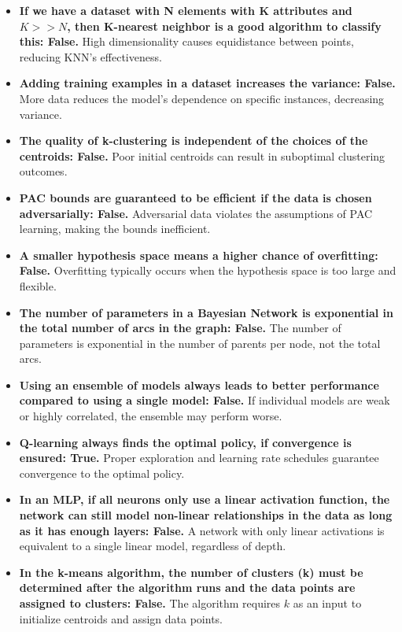 \documentclass[10pt,a4paper]{article}
\begin{document}
\begin{itemize}
    \item \textbf{If we have a dataset with N elements with K attributes and $K >> N$, then K-nearest neighbor is a good algorithm to classify this: False.} High dimensionality causes equidistance between points, reducing KNN's effectiveness.

    \item \textbf{Adding training examples in a dataset increases the variance: False.} More data reduces the model's dependence on specific instances, decreasing variance.

    \item \textbf{The quality of k-clustering is independent of the choices of the centroids: False.} Poor initial centroids can result in suboptimal clustering outcomes.

    \item \textbf{PAC bounds are guaranteed to be efficient if the data is chosen adversarially: False.} Adversarial data violates the assumptions of PAC learning, making the bounds inefficient.

    \item \textbf{A smaller hypothesis space means a higher chance of overfitting: False.} Overfitting typically occurs when the hypothesis space is too large and flexible.

    \item \textbf{The number of parameters in a Bayesian Network is exponential in the total number of arcs in the graph: False.} The number of parameters is exponential in the number of parents per node, not the total arcs.

    \item \textbf{Using an ensemble of models always leads to better performance compared to using a single model: False.} If individual models are weak or highly correlated, the ensemble may perform worse.

    \item \textbf{Q-learning always finds the optimal policy, if convergence is ensured: True.} Proper exploration and learning rate schedules guarantee convergence to the optimal policy.

    \item \textbf{In an MLP, if all neurons only use a linear activation function, the network can still model non-linear relationships in the data as long as it has enough layers: False.} A network with only linear activations is equivalent to a single linear model, regardless of depth.

    \item \textbf{In the k-means algorithm, the number of clusters (k) must be determined after the algorithm runs and the data points are assigned to clusters: False.} The algorithm requires $k$ as an input to initialize centroids and assign data points.

\end{itemize}
\end{document}
